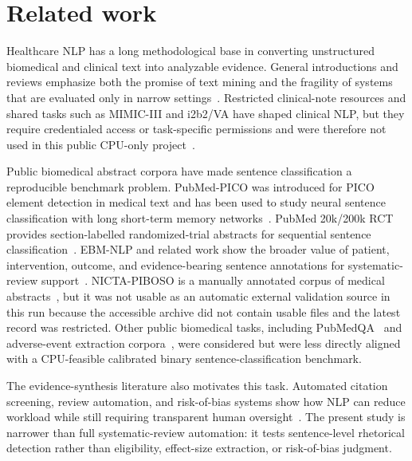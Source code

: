 \section*{Related work}
Healthcare NLP has a long methodological base in converting unstructured biomedical and clinical text into analyzable evidence. General introductions and reviews emphasize both the promise of text mining and the fragility of systems that are evaluated only in narrow settings~\cite{nadkarni2011nlp,zweigenbaum2007frontiers,kreimeyer2017nlpsystems,wang2018clinicalie}. Restricted clinical-note resources and shared tasks such as MIMIC-III and i2b2/VA have shaped clinical NLP, but they require credentialed access or task-specific permissions and were therefore not used in this public CPU-only project~\cite{johnson2016mimic,uzuner2011i2b2}.

Public biomedical abstract corpora have made sentence classification a reproducible benchmark problem. PubMed-PICO was introduced for PICO element detection in medical text and has been used to study neural sentence classification with long short-term memory networks~\cite{jin2018pico}. PubMed 20k/200k RCT provides section-labelled randomized-trial abstracts for sequential sentence classification~\cite{dernoncourt2017pubmed}. EBM-NLP and related work show the broader value of patient, intervention, outcome, and evidence-bearing sentence annotations for systematic-review support~\cite{nye2018ebmnlp,kim2011ebm}. NICTA-PIBOSO is a manually annotated corpus of medical abstracts~\cite{amini2018nicta}, but it was not usable as an automatic external validation source in this run because the accessible archive did not contain usable files and the latest record was restricted. Other public biomedical tasks, including PubMedQA~\cite{jin2019pubmedqa} and adverse-event extraction corpora~\cite{gurulingappa2012ade}, were considered but were less directly aligned with a CPU-feasible calibrated binary sentence-classification benchmark.

The evidence-synthesis literature also motivates this task. Automated citation screening, review automation, and risk-of-bias systems show how NLP can reduce workload while still requiring transparent human oversight~\cite{cohen2006workload,tsafnat2014automation,marshall2014risk,marshall2015risk,marshall2015robotreviewer}. The present study is narrower than full systematic-review automation: it tests sentence-level rhetorical detection rather than eligibility, effect-size extraction, or risk-of-bias judgment.

